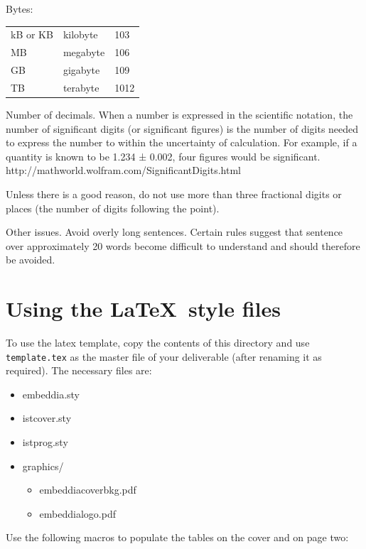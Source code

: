 \documentclass[10pt]{report}
\begin{document}
Bytes:\\
\begin{tabular}{lll}
  kB or KB&	kilobyte&	103\\ 
MB&	megabyte&106\\ 
GB	&gigabyte	&109\\ 
TB	&terabyte	&1012\\ 
\end{tabular}


Number of decimals. When a number is expressed in the scientific notation, the number of significant digits (or significant figures) is the number of digits needed to express the number to within the uncertainty of calculation. For example, if a quantity is known to be 1.234 ± 0.002, four figures would be significant. http://mathworld.wolfram.com/SignificantDigits.html

Unless there is a good reason, do not use more than three fractional digits or places (the number of digits following the point).

Other issues. Avoid overly long sentences. Certain rules suggest that sentence over approximately 20 words become difficult to understand and should therefore be avoided. 

\section{Using the \LaTeX\ style files}

\newcommand{\macro}[1]{{\tt \textbackslash #1}}

To use the latex template, copy the contents of this directory and use
{\tt template.tex} as the master file of your deliverable (after
renaming it as required). The necessary files are:

\begin{itemize}
\item embeddia.sty
\item istcover.sty
\item istprog.sty
\item graphics/
  \begin{itemize}
  \item embeddiacoverbkg.pdf
  \item embeddialogo.pdf
  \end{itemize}
\end{itemize}

Use the following macros to populate the tables on the cover and on
page two:
\end{document}
